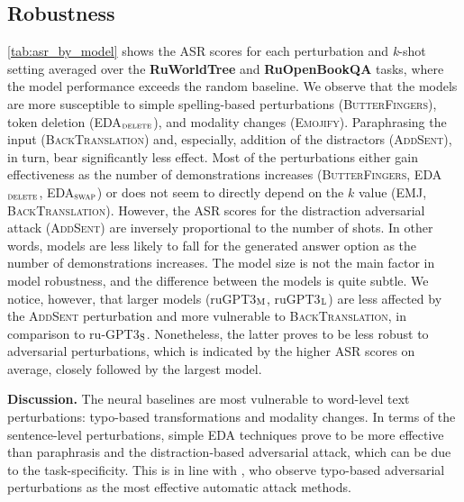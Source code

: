 \documentclass[11pt]{article}
\begin{document}
\subsection{Robustness}
\autoref{tab:asr_by_model} shows the ASR scores for each perturbation and \textit{k}-shot setting averaged over the \textbf{RuWorldTree} and \textbf{RuOpenBookQA} tasks, where the model performance exceeds the random baseline. We observe that the models are more susceptible to simple spelling-based perturbations (\textsc{ButterFingers}), token deletion (\textsc{EDA}$_\textsc{delete}$), and modality changes (\textsc{Emojify}). Paraphrasing the input (\textsc{BackTranslation}) and, especially, addition of the distractors (\textsc{AddSent}), in turn, bear significantly less effect. Most of the perturbations either gain effectiveness as the number of demonstrations increases (\textsc{ButterFingers}, \textsc{EDA}$_\textsc{delete}$, \textsc{EDA}$_\textsc{swap}$) or does not seem to directly depend on the $k$ value (\textsc{EMJ}, \textsc{BackTranslation}). However, the ASR scores for the distraction adversarial attack (\textsc{AddSent}) are inversely proportional to the number of shots. In other words, models are less likely to fall for the generated answer option as the number of demonstrations increases. The model size is not the main factor in model robustness, and the difference between the models is quite subtle. We notice, however, that larger models (ruGPT3$_\textsc{M}$, ruGPT3$_\textsc{L}$) are less affected by the \textsc{AddSent} perturbation and more vulnerable to \textsc{BackTranslation}, in comparison to ru-GPT3$_\textsc{S}$. Nonetheless, the latter proves to be less robust to adversarial perturbations, which is indicated by the higher ASR scores on average, closely followed by the largest model. 

\vspace{0.1em} \noindent\textbf{Discussion.} The neural baselines are most vulnerable to word-level text perturbations: typo-based transformations and modality changes. In terms of the sentence-level perturbations, simple EDA techniques prove to be more effective than paraphrasis and the distraction-based adversarial attack, which can be due to the task-specificity. This is in line with \citet{wang2021adversarial}, who observe typo-based adversarial perturbations as the most effective automatic attack methods.
\end{document}

